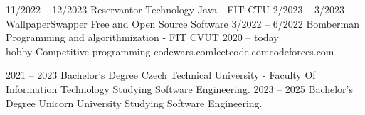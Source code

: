 \documentclass[9pt]{developercv} %
\begin{document}
\begin{entrylist}
	\entry
		{11/2022 -- 12/2023}
		{Reservantor}
		{Technology Java - FIT CTU}
		{}
	\entry
		{2/2023 -- 3/2023}
		{WallpaperSwapper}
		{Free and Open Source Software}
		{}
	\entry
		{3/2022 -- 6/2022}
		{Bomberman}
		{Programming and algorithmization - FIT CVUT}
		{}
	\entry
		{2020 -- today\\\footnotesize{hobby}}
		{Competitive programming}
		{codewars.com\slashsep leetcode.com\slashsep codeforces.com}
		{}
\end{entrylist}



\begin{entrylist}
	\entry
		{2021 -- 2023}
		{Bachelor's Degree}
		{Czech Technical University - Faculty Of Information Technology}
		{Studying Software Engineering.}
	\entry
		{2023 -- 2025}
		{Bachelor's Degree}
		{Unicorn University}
		{Studying Software Engineering.}
\end{entrylist}

\end{document}

